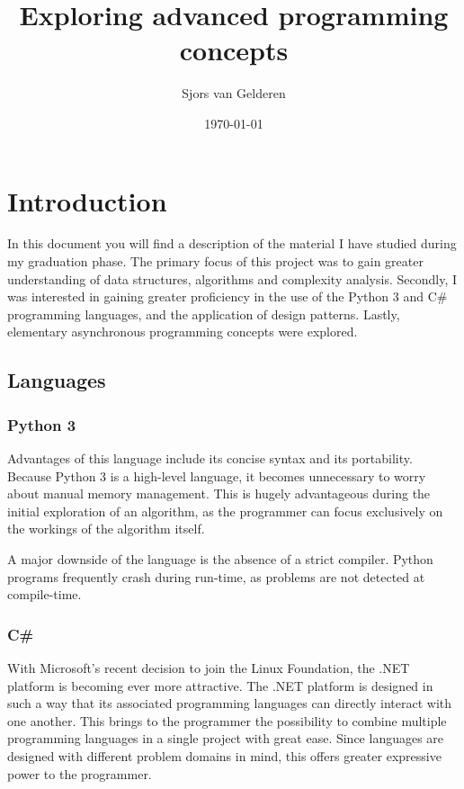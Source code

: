 \documentclass{article}
\author{Sjors van Gelderen}
\title{Exploring advanced programming concepts}
\date{\today{}}
\begin{document}
\maketitle{}

\newpage

\tableofcontents{}

\newpage

\section{Introduction}
In this document you will find a description of the material I have studied during my graduation phase.
The primary focus of this project was to gain greater understanding of data structures, algorithms and complexity analysis.
Secondly, I was interested in gaining greater proficiency in the use of the Python 3 and C\# programming languages, and the application of design patterns.
Lastly, elementary asynchronous programming concepts were explored.

\subsection{Languages}
\subsubsection{Python 3}
Advantages of this language include its concise syntax and its portability.
Because Python 3 is a high-level language, it becomes unnecessary to worry about manual memory management.
This is hugely advantageous during the initial exploration of an algorithm, as the programmer can focus exclusively on
the workings of the algorithm itself.

A major downside of the language is the absence of a strict compiler.
Python programs frequently crash during run-time, as problems are not detected at compile-time.

\subsubsection{C\#}
With Microsoft's recent decision to join the Linux Foundation, the .NET platform is becoming ever more attractive.
The .NET platform is designed in such a way that its associated programming languages can directly interact with one another.
This brings to the programmer the possibility to combine multiple programming languages in a single project with great ease.
Since languages are designed with different problem domains in mind, this offers greater expressive power to the programmer.
\end{document}
